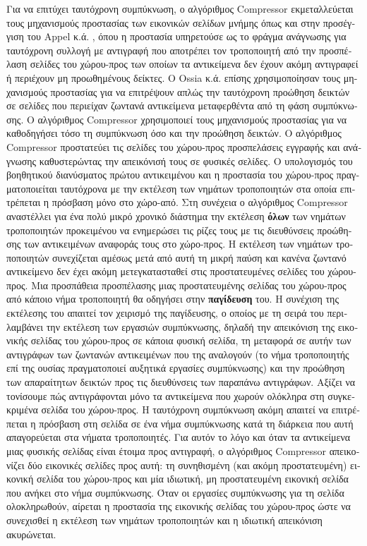 \begin{greek}
Για να επιτύχει ταυτόχρονη συμπύκνωση, ο αλγόριθμος Compressor
εκμεταλλεύεται τους μηχανισμούς προστασίας των εικονικών σελίδων
μνήμης όπως και στην προσέγγιση του Appel κ.ά. \cite{DBLP:conf/pldi/AppelEL88},
όπου η προστασία υπηρετούσε ως το φράγμα ανάγνωσης για ταυτόχρονη
συλλογή με αντιγραφή που αποτρέπει τον τροποποιητή από την
προσπέλαση σελίδες του χώρου-προς των οποίων τα αντικείμενα δεν
έχουν ακόμη αντιγραφεί ή περιέχουν μη προωθημένους δείκτες.
O Ossia κ.ά. \cite{DBLP:conf/iwmm/OssiaBS04} επίσης χρησιμοποίησαν
τους μηχανισμούς προστασίας για να επιτρέψουν απλώς την ταυτόχρονη
προώθηση δεικτών σε σελίδες που περιείχαν ζωντανά αντικείμενα
μεταφερθέντα από τη φάση συμπύκνωσης. Ο αλγόριθμος Compressor
χρησιμοποιεί τους μηχανισμούς προστασίας για να καθοδηγήσει τόσο
τη συμπύκνωση όσο και την προώθηση δεικτών. Ο αλγόριθμος Compressor
προστατεύει τις σελίδες του χώρου-προς προσπελάσεις εγγραφής
και ανάγνωσης καθυστερώντας την απεικόνισή τους σε φυσικές σελίδες.
Ο υπολογισμός του βοηθητικού διανύσματος πρώτου αντικειμένου
και η προστασία του χώρου-προς πραγματοποιείται ταυτόχρονα
με την εκτέλεση των νημάτων τροποποιητών στα οποία επιτρέπεται
η πρόσβαση μόνο στο χώρο-από. Στη συνέχεια ο αλγόριθμος
Compressor αναστέλλει για ένα πολύ μικρό χρονικό διάστημα την
εκτέλεση \textbf{όλων} των νημάτων τροποποιητών προκειμένου
να ενημερώσει τις ρίζες τους με τις διευθύνσεις προώθησης των
αντικειμένων αναφοράς τους στο χώρο-προς. Η εκτέλεση των νημάτων
τροποποιητών συνεχίζεται αμέσως μετά από αυτή τη μικρή παύση
και κανένα ζωντανό αντικείμενο δεν έχει ακόμη μετεγκατασταθεί
στις προστατευμένες σελίδες του χώρου-προς. Μια προσπάθεια
προσπέλασης μιας προστατευμένης σελίδας του χώρου-προς από
κάποιο νήμα τροποποιητή θα οδηγήσει στην \textbf{παγίδευση}
του. Η συνέχιση της εκτέλεσης του απαιτεί τον χειρισμό της
παγίδευσης, ο οποίος με τη σειρά του περιλαμβάνει την εκτέλεση
των εργασιών συμπύκνωσης, δηλαδή την απεικόνιση της εικονικής
σελίδας του χώρου-προς σε κάποια φυσική σελίδα, τη μεταφορά
σε αυτήν των αντιγράφων των ζωντανών αντικειμένων που της
αναλογούν (το νήμα τροποποιητής επί της ουσίας πραγματοποιεί
αυξητικά εργασίες συμπύκνωσης) και την προώθηση των απαραίτητων
δεικτών προς τις διευθύνσεις των παραπάνω αντιγράφων. Αξίζει
να τονίσουμε πώς αντιγράφονται μόνο τα αντικείμενα που χωρούν
ολόκληρα στη συγκεκριμένα σελίδα του χώρου-προς. Η ταυτόχρονη
συμπύκνωση ακόμη απαιτεί να επιτρέπεται η πρόσβαση στη σελίδα
σε ένα νήμα συμπύκνωσης κατά τη διάρκεια που αυτή απαγορεύεται
στα νήματα τροποποιητές. Για αυτόν το λόγο και όταν τα αντικείμενα
μιας φυσικής σελίδας είναι έτοιμα προς αντιγραφή, ο αλγόριθμος
Compressor απεικονίζει δύο εικονικές σελίδες προς αυτή: τη
συνηθισμένη (και ακόμη προστατευμένη) εικονική σελίδα του χώρου-προς
και μία ιδιωτική, μη προστατευμένη εικονική σελίδα που ανήκει
στο νήμα συμπύκνωσης. Όταν οι εργασίες συμπύκνωσης για τη σελίδα
ολοκληρωθούν, αίρεται η προστασία της εικονικής σελίδας του χώρου-προς
ώστε να συνεχισθεί η εκτέλεση των νημάτων τροποποιητών και η
ιδιωτική απεικόνιση ακυρώνεται.


\end{greek}
